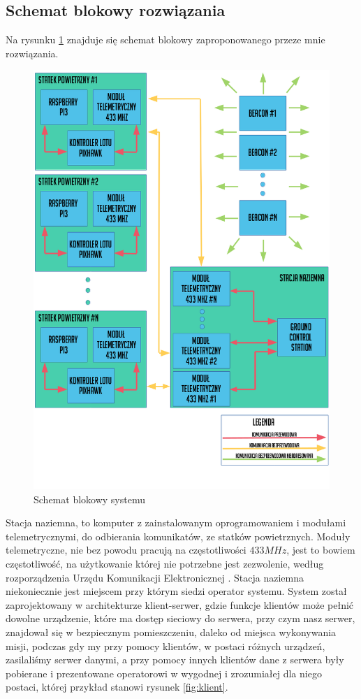 \subsection{Schemat blokowy rozwiązania}
Na rysunku \ref{fig:schematblokowy} znajduje się schemat blokowy zaproponowanego przeze mnie rozwiązania.
\begin{figure}[!th]
    \centering
    \includegraphics[width=14cm]{zalaczniki/obrazy/schemat_ogolny.png}
    \caption{Schemat blokowy systemu}
    \label{fig:schematblokowy}
\end{figure}

Stacja naziemna, to komputer z zainstalowanym oprogramowaniem i modułami telemetrycznymi, do odbierania komunikatów, ze statków powietrznych. Moduły telemetryczne, nie bez powodu pracują na częstotliwości $433 MHz$, jest to bowiem częstotliwość, na użytkowanie której nie potrzebne jest zezwolenie, według rozporządzenia Urzędu Komunikacji Elektronicznej \cite{rozporzadzenieuke}. Stacja naziemna niekoniecznie jest miejscem przy którym siedzi operator systemu. System został zaprojektowany w architekturze klient-serwer, gdzie funkcje klientów może pełnić dowolne urządzenie, które ma dostęp sieciowy do serwera, przy czym nasz serwer, znajdował się w bezpiecznym pomieszczeniu, daleko od miejsca wykonywania misji, podczas gdy my przy pomocy klientów, w postaci różnych urządzeń, zasilaliśmy serwer danymi, a przy pomocy innych klientów dane z serwera były pobierane i prezentowane operatorowi w wygodnej i zrozumiałej dla niego postaci, której przykład stanowi rysunek \ref{fig:klient}.

